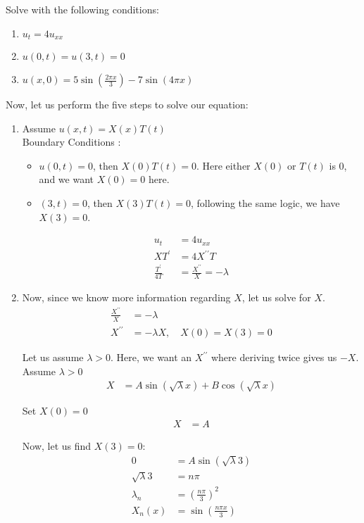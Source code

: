 \ex Solve with the following conditions:

\begin{enumerate}
  \item $u_t = 4u_{xx}$
  \item $u(0, t) = u(3, t) = 0$
  \item $u(x, 0) = 5 \sin \left( \frac{2 \pi x}{3} \right) - 7 \sin(4 \pi x)$
\end{enumerate}

Now, let us perform the five steps to solve our equation:

\begin{enumerate}
  \item Assume $u(x, t) = X(x)T(t)$\\
  Boundary Conditions :
  \begin{itemize}
    \item $u(0, t) = 0$, then $X(0)T(t) = 0$. Here either $X(0)$ or $T(t)$ is $0$, and we want $X(0) = 0$ here.
    \item $(3, t) = 0$, then $X(3)T(t) = 0$, following the same logic, we have $X(3) = 0$.
  \end{itemize}
  \begin{align}
    u_t & = 4u_{xx}\\
    XT^\prime & = 4X^{\prime\prime}T\\
    \frac{T^\prime}{4T} & = \frac{X^{\prime\prime}}{X} = -\lambda
  \end{align}

  \item Now, since we know more information regarding $X$, let us solve for $X$.
  \begin{align}
    \frac{X^{\prime\prime}}{X} & = -\lambda\\
    X^{\prime\prime} & = -\lambda X, \quad X(0) = X(3) = 0
  \end{align}

  Let us assume $\lambda > 0$. Here, we want an $X^{\prime\prime}$ where deriving twice gives us $-X$. Assume $\lambda > 0$
  \begin{align}
    X & = A\sin(\sqrt \lambda x) + B \cos(\sqrt \lambda x)
  \end{align}

  Set $X(0) = 0$
  \begin{align}
    X & = A
  \end{align}

  Now, let us find $X(3) = 0$:
  \begin{align}
    0 & = A\sin(\sqrt \lambda 3)\\
    \sqrt \lambda 3 & = n \pi\\
    \lambda_n & = \left( \frac{n \pi}{3} \right)^2\\
    X_n(x) & = \sin \left(\frac{n \pi x}{3} \right)
  \end{align}


\end{enumerate}
